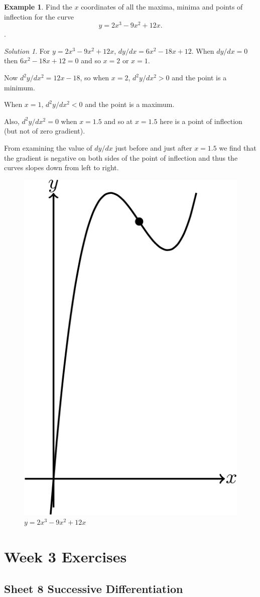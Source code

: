 \documentclass[
  11pt,
  oneside]{book}
\theoremstyle{definition}
\theoremstyle{definition}
\newtheorem{example}{Example}[chapter]
\theoremstyle{definition}
\theoremstyle{definition}
\theoremstyle{remark}
\newtheorem*{solution}{Solution}
\begin{document}
\begin{example}
Find the \(x\) coordinates of all the maxima, minima and points of inflection for the curve
\[
y = 2x^3-9x^2+12x.
\].
\end{example}

\begin{solution}

For \(y = 2x^3-9x^2+12x\), \(dy/dx = 6x^2-18x+12\). When \(dy/dx=0\) then \(6x^2-18x+12=0\) and so \(x=2\) or \(x=1\).

Now \(d^2y/dx^2 = 12x-18\), so when \(x=2\), \(d^2y/dx^2>0\) and the point is a minimum.

When \(x=1\), \(d^2y/dx^2<0\) and the point is a maximum.

Also, \(d^2y/dx^2=0\) when \(x=1.5\) and so at \(x=1.5\) here is a point of inflection (but not of zero gradient).

From examining the value of \(dy/dx\) just before and just after \(x=1.5\) we find that the gradient is negative on both sides of the point of inflection and thus the curves slopes down from left to right.

\begin{figure}

{\centering \includegraphics[width=0.3\linewidth]{tikztopng-figure11} 

}

\caption{$y = 2x^3-9x^2+12x$}\label{fig:unnamed-chunk-22}
\end{figure}

\end{solution}

\chapter*{Week 3 Exercises}\label{week-3-exercises}

\section{Sheet 8 Successive Differentiation}\label{sheet-8-successive-differentiation}
\end{document}

